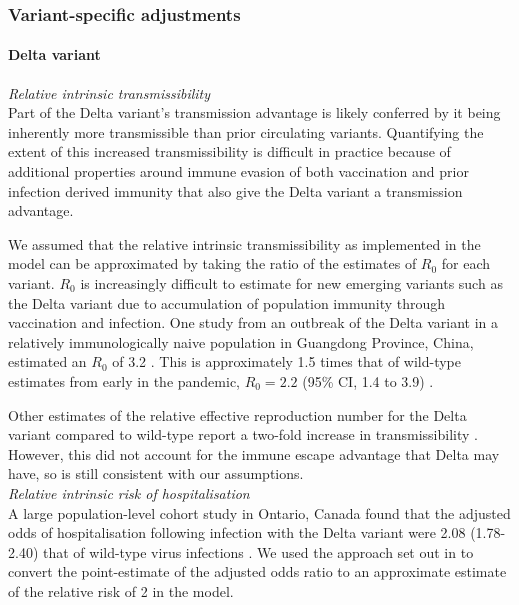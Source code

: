 \subsubsection{Variant-specific adjustments}
\label{strain_params}
\paragraph{Delta variant}

\textit{Relative intrinsic transmissibility}\\
Part of the Delta variant's transmission advantage is likely conferred by it being inherently more transmissible than prior circulating 
variants. Quantifying the extent of this increased transmissibility is difficult in practice because of additional properties around immune 
evasion of both vaccination and prior infection derived immunity that also give the Delta variant a transmission advantage.

We assumed that the relative intrinsic transmissibility as implemented in the model can be approximated by taking the ratio of the estimates 
of $R_0$ for each variant. $R_0$ is increasingly difficult to estimate for new emerging variants such as the Delta variant due to accumulation of 
population immunity through vaccination and infection. One study from an outbreak of the Delta variant in a relatively immunologically naive population 
in Guangdong Province, China, estimated an $R_{0}$ of 3.2 \cite{meng2021}. This is approximately 1.5 times that of wild-type estimates from early in the 
pandemic, $R_0=2.2$ (95\% CI, 1.4 to 3.9) \cite{li2020}. 

Other estimates of the relative effective reproduction number for the Delta variant compared to wild-type report a two-fold increase in transmissibility \cite{campbell2021}. 
However, this did not account for the immune escape advantage that Delta may have, so is still consistent with our assumptions.\\

\textit{Relative intrinsic risk of hospitalisation}\\
A large population-level cohort study in Ontario, Canada found that the adjusted odds of hospitalisation following infection with the Delta variant were 2.08 (1.78-2.40) that of 
wild-type virus infections \cite{fisman2021}. We used the approach set out in \cite{zhang1998} to convert the point-estimate of the adjusted odds ratio to an approximate estimate 
of the relative risk of 2 in the model.\\

